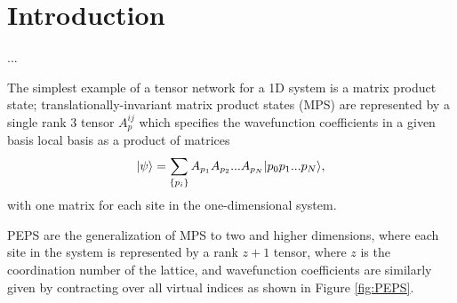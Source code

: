 
\section{Introduction}

...\cite{parameswaran2013, parameswaran2013-2}

The simplest example of a tensor network for a 1D system is a matrix 
product state; translationally-invariant matrix product states (MPS) 
are represented by a single rank 3 tensor $A_p^{ij}$ which specifies 
the wavefunction coefficients in a given basis local basis as a 
product of matrices $$\vert \psi \rangle = \sum\limits_{\{p_i\}} A_{p_1} 
A_{p_2} ... A_{p_N} \vert p_0 p_1 ... p_N \rangle,$$ with one matrix for each 
site in the one-dimensional system.

PEPS are the generalization of MPS to two and higher dimensions, where 
each site in the system is represented by a rank $z+1$ tensor, where 
$z$ is the coordination number of the lattice, and wavefunction 
coefficients are similarly given by contracting over all virtual 
indices as shown in Figure \ref{fig:PEPS}.\cite{verstraete2004}